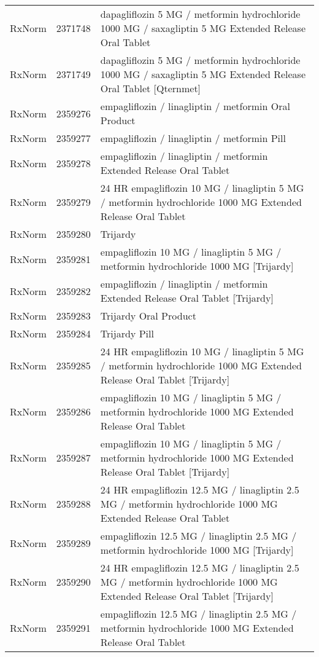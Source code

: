 \begin{longtable}{p{}p{}p{}}
  RxNorm & 2371748 & dapagliflozin 5 MG / metformin hydrochloride 1000 MG / saxagliptin 5 MG Extended Release Oral Tablet \\ 
  RxNorm & 2371749 & dapagliflozin 5 MG / metformin hydrochloride 1000 MG / saxagliptin 5 MG Extended Release Oral Tablet [Qternmet] \\ 
  RxNorm & 2359276 & empagliflozin / linagliptin / metformin Oral Product \\ 
  RxNorm & 2359277 & empagliflozin / linagliptin / metformin Pill \\ 
  RxNorm & 2359278 & empagliflozin / linagliptin / metformin Extended Release Oral Tablet \\ 
  RxNorm & 2359279 & 24 HR empagliflozin 10 MG / linagliptin 5 MG / metformin hydrochloride 1000 MG Extended Release Oral Tablet \\ 
  RxNorm & 2359280 & Trijardy \\ 
  RxNorm & 2359281 & empagliflozin 10 MG / linagliptin 5 MG / metformin hydrochloride 1000 MG [Trijardy] \\ 
  RxNorm & 2359282 & empagliflozin / linagliptin / metformin Extended Release Oral Tablet [Trijardy] \\ 
  RxNorm & 2359283 & Trijardy Oral Product \\ 
  RxNorm & 2359284 & Trijardy Pill \\ 
  RxNorm & 2359285 & 24 HR empagliflozin 10 MG / linagliptin 5 MG / metformin hydrochloride 1000 MG Extended Release Oral Tablet [Trijardy] \\ 
  RxNorm & 2359286 & empagliflozin 10 MG / linagliptin 5 MG / metformin hydrochloride 1000 MG Extended Release Oral Tablet \\ 
  RxNorm & 2359287 & empagliflozin 10 MG / linagliptin 5 MG / metformin hydrochloride 1000 MG Extended Release Oral Tablet [Trijardy] \\ 
  RxNorm & 2359288 & 24 HR empagliflozin 12.5 MG / linagliptin 2.5 MG / metformin hydrochloride 1000 MG Extended Release Oral Tablet \\ 
  RxNorm & 2359289 & empagliflozin 12.5 MG / linagliptin 2.5 MG / metformin hydrochloride 1000 MG [Trijardy] \\ 
  RxNorm & 2359290 & 24 HR empagliflozin 12.5 MG / linagliptin 2.5 MG / metformin hydrochloride 1000 MG Extended Release Oral Tablet [Trijardy] \\ 
  RxNorm & 2359291 & empagliflozin 12.5 MG / linagliptin 2.5 MG / metformin hydrochloride 1000 MG Extended Release Oral Tablet \\ 

\end{longtable}
